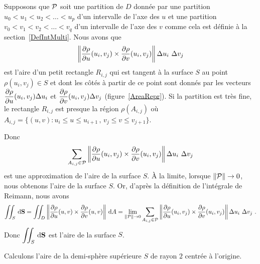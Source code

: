 {\begin{rmk}[\theory]
Supposons que $\cal P$ soit une partition de $D$ donnée par une partition
$u_0 < u_1 < u_2 < \ldots < u_p$ d'un intervalle de l'axe des $u$ et
une partition $v_0 < v_1 < v_2 < \ldots < v_{q}$ d'un intervalle de
l'axe des $v$ comme cela est définie à la section~\ref{DefIntMulti}.
Nous avons que
\[
\left\| \frac{\partial \rho}{\partial u}(u_i,v_j) \times \frac{\partial \rho}{\partial v}(u_i,v_j) \right\|
\Delta u_i \ \Delta v_j
\]
est l'aire d'un petit rectangle $R_{i,j}$ qui est tangent
à la surface $S$ au point $\rho(u_i,v_j) \in S$ et dont les côtés à
partir de ce point sont donnés par les vecteurs
$\displaystyle \frac{\partial \rho}{\partial u}(u_i,v_j) \Delta u_i$ et
$\displaystyle \frac{\partial \rho}{\partial v}(u_i,v_j) \Delta v_j$
(figure~\ref{AreaRepr}).  Si
la partition est très fine, le rectangle $R_{i,j}$ est presque la région
$\rho(A_{i,j})$ où
$A_{i,j} = \{(u,v) : u_i \leq u \leq u_{i+1}\, , \, v_j\leq v \leq v_{j+1}\}$.

Donc
\[
\sum_{A_{i,j}\in\cal P}
\left\| \frac{\partial \rho}{\partial u}(u_i,v_j) \times \frac{\partial \rho}{\partial v}(u_i,v_j) \right\|
\Delta u_i \ \Delta v_j
\]
est une approximation de l'aire de la surface $S$.  À la limite,
lorsque $\|{\cal P}\| \to 0$, nous obtenons l'aire de la surface $S$.
Or, d'après la définition de l'intégrale de Reimann, nous avons
\[
\iint_S \,\mathrm{d}\mathbf{S}
= \iint_D \left\|\frac{\partial \rho}{\partial u}(u,v)
\times \frac{\partial \rho}{\partial v}(u,v)\right\| \,\mathrm{d}A
=
\lim_{\|{\cal P}\|\to 0} \sum_{A_{i,j}\in\cal P}
\left\| \frac{\partial \rho}{\partial u}(u_i,v_j) \times \frac{\partial \rho}{\partial v}(u_i,v_j) \right\|
\Delta u_i \ \Delta v_j \ .
\]
Donc $\displaystyle \iint_S \,\mathrm{d}\mathbf{S}$ est l'aire de la surface $S$.
\label{AreaReprRMK}
\end{rmk}


\begin{egg}
Calculons l'aire de la demi-sphère supérieure $S$ de rayon
$2$ centrée à l'origine.


\end{egg}}

